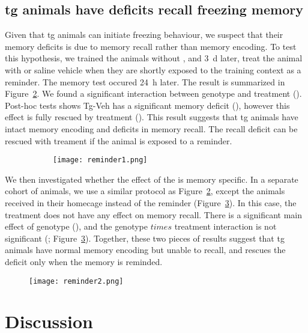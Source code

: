 \subsection{\Gls{tg} animals have deficits recall freezing memory}
Given that \gls{tg} animals can initiate freezing behaviour, we suspect that their memory deficits is due to memory recall rather than memory encoding. To test this hypothesis, we trained the animals without \tglu, and \SI{3}{\day} later, treat the animal with \tglu or saline vehicle when they are shortly exposed to the training context as a reminder. The memory test occured \SI{24}{\hour} later. The result is summarized in Figure~\ref{f.ad.reminder1}. We found a significant interaction between genotype and treatment (). Post-hoc tests shows Tg-Veh has a significant memory deficit (), however this effect is fully rescued by \tglu treatment (). This result suggests that \gls{tg} animals have intact memory encoding and deficits in memory recall. The recall deficit can be rescued with \tglu treament if the animal is exposed to a reminder.

\begin{figure}[h]
    \begin{subfigure}[h]{\textwidth}
        \texttt{[image: reminder1.png]}
        \caption{\label{f.ad.actf}}
    \end{subfigure}
    \caption{ \label{f.ad.reminder1}}
\end{figure}

We then investigated whether the effect of the \tglu is memory specific. In a separate cohort of animals, we use a similar protocol as Figure~\ref{f.ad.reminder1}, except the animals received \tglu in their homecage instead of the reminder (Figure~\ref{f.ad.reminder2}). In this case, the \tglu treatment does not have any effect on memory recall. There is a significant main effect of genotype (), and the genotype $times$ treatment interaction is not significant (; Figure~\ref{f.ad.reminder2}). Together, these two pieces of results suggest that \gls{tg} animals have normal memory encoding but unable to recall, and \tglu rescues the deficit only when the memory is reminded.


\begin{figure}[h]
    \texttt{[image: reminder2.png]}
    \caption{\label{f.ad.reminder2}}
\end{figure}

\section{Discussion}
